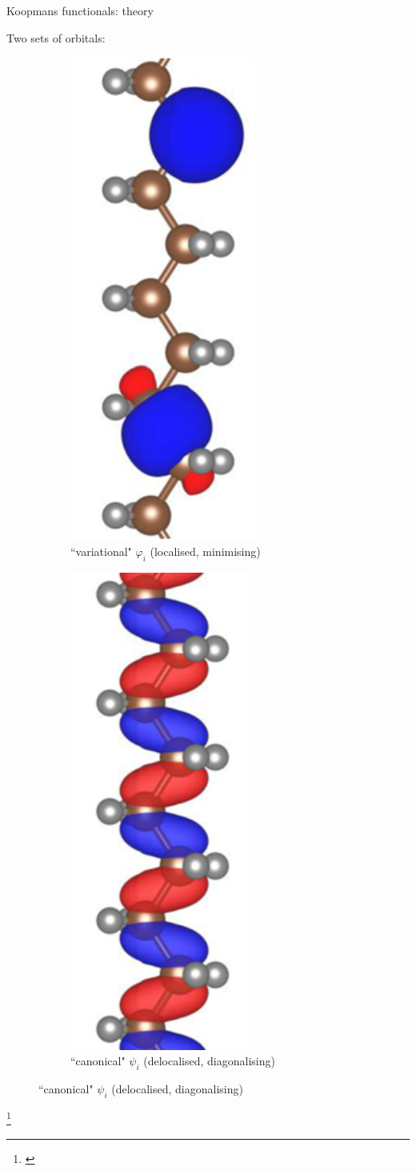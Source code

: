 \documentclass[xcolor=table,aspectratio=169]{beamer}
\newcommand\blfootcite[1]{%
  \begingroup
  \renewcommand\thefootnote{}\footnote{\hspace{-4ex}\cite{#1}}%
  \addtocounter{footnote}{-1}%
  \endgroup
}
\numberwithin{equation}{section}
\begin{document}
\begin{frame}{Koopmans functionals: theory}

   Two sets of orbitals:

   \begin{figure}[t]
      \centering
      \begin{subfigure}{0.45\textwidth}
         \includegraphics[height=0.8\columnwidth,angle=90]{figures/fig_nguyen_variational_orbital.png}
         \caption{``variational" $\varphi_i$ (localised, minimising)}
      \end{subfigure}
      \begin{subfigure}{0.45\textwidth}
         \includegraphics[height=0.8\columnwidth,angle=90]{figures/fig_nguyen_canonical_orbital.png}
         \caption{``canonical" $\psi_i$ (delocalised, diagonalising)}
      \end{subfigure}
   \end{figure}
   \blfootcite{Nguyen2018}


\end{frame}
\end{document}
